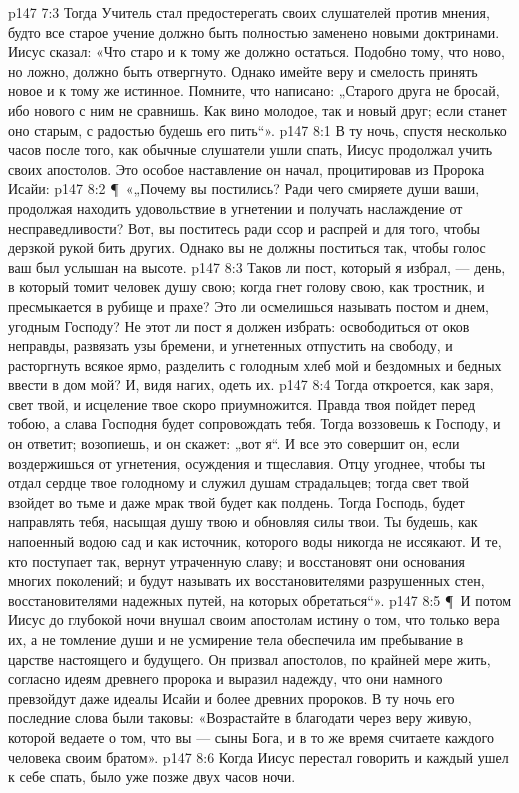 \vs p147 7:3 Тогда Учитель стал предостерегать своих слушателей против мнения, будто все старое учение должно быть полностью заменено новыми доктринами. Иисус сказал: «Что старо и к тому же  должно остаться. Подобно тому, что ново, но ложно, должно быть отвергнуто. Однако имейте веру и смелость принять новое и к тому же истинное. Помните, что написано: „Старого друга не бросай, ибо нового с ним не сравнишь. Как вино молодое, так и новый друг; если станет оно старым, с радостью будешь его пить“».
\vs p147 8:1 В ту ночь, спустя несколько часов после того, как обычные слушатели ушли спать, Иисус продолжал учить своих апостолов. Это особое наставление он начал, процитировав из Пророка Исайи:
\vs p147 8:2 \P\ «„Почему вы постились? Ради чего смиряете души ваши, продолжая находить удовольствие в угнетении и получать наслаждение от несправедливости? Вот, вы поститесь ради ссор и распрей и для того, чтобы дерзкой рукой бить других. Однако вы не должны поститься так, чтобы голос ваш был услышан на высоте.
\vs p147 8:3 Таков ли пост, который я избрал, --- день, в который томит человек душу свою; когда гнет голову свою, как тростник, и пресмыкается в рубище и прахе? Это ли осмелишься называть постом и днем, угодным Господу? Не этот ли пост я должен избрать: освободиться от оков неправды, развязать узы бремени, и угнетенных отпустить на свободу, и расторгнуть всякое ярмо, разделить с голодным хлеб мой и бездомных и бедных ввести в дом мой? И, видя нагих, одеть их.
\vs p147 8:4 Тогда откроется, как заря, свет твой, и исцеление твое скоро приумножится. Правда твоя пойдет перед тобою, а слава Господня будет сопровождать тебя. Тогда воззовешь к Господу, и он ответит; возопиешь, и он скажет: „вот я“. И все это совершит он, если воздержишься от угнетения, осуждения и тщеславия. Отцу угоднее, чтобы ты отдал сердце твое голодному и служил душам страдальцев; тогда свет твой взойдет во тьме и даже мрак твой будет как полдень. Тогда Господь, будет направлять тебя, насыщая душу твою и обновляя силы твои. Ты будешь, как напоенный водою сад и как источник, которого воды никогда не иссякают. И те, кто поступает так, вернут утраченную славу; и восстановят они основания многих поколений; и будут называть их восстановителями разрушенных стен, восстановителями надежных путей, на которых обретаться“».
\vs p147 8:5 \P\ И потом Иисус до глубокой ночи внушал своим апостолам истину о том, что только вера их, а не томление души и не усмирение тела обеспечила им пребывание в царстве настоящего и будущего. Он призвал апостолов, по крайней мере жить, согласно идеям древнего пророка и выразил надежду, что они намного превзойдут даже идеалы Исайи и более древних пророков. В ту ночь его последние слова были таковы: «Возрастайте в благодати через веру живую, которой ведаете о том, что вы --- сыны Бога, и в то же время считаете каждого человека своим братом».
\vs p147 8:6 Когда Иисус перестал говорить и каждый ушел к себе спать, было уже позже двух часов ночи.

